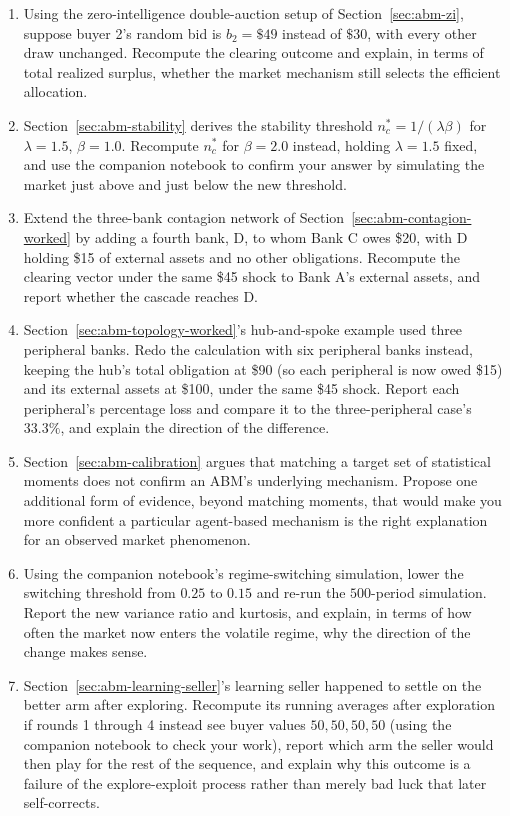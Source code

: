 \documentclass[../ai_in_finance]{subfiles}
\begin{document}

\begin{enumerate}[exercises]
    \item Using the zero-intelligence double-auction setup of Section~\ref{sec:abm-zi}, suppose buyer 2's random bid is $b_2=\$49$ instead of $\$30$, with every other draw unchanged. Recompute the clearing outcome and explain, in terms of total realized surplus, whether the market mechanism still selects the efficient allocation.
    \item Section~\ref{sec:abm-stability} derives the stability threshold $n_c^{*}=1/(\lambda\beta)$ for $\lambda=1.5$, $\beta=1.0$. Recompute $n_c^{*}$ for $\beta=2.0$ instead, holding $\lambda=1.5$ fixed, and use the companion notebook to confirm your answer by simulating the market just above and just below the new threshold.
    \item Extend the three-bank contagion network of Section~\ref{sec:abm-contagion-worked} by adding a fourth bank, D, to whom Bank C owes \$20, with D holding \$15 of external assets and no other obligations. Recompute the clearing vector under the same \$45 shock to Bank A's external assets, and report whether the cascade reaches D.
    \item Section~\ref{sec:abm-topology-worked}'s hub-and-spoke example used three peripheral banks. Redo the calculation with six peripheral banks instead, keeping the hub's total obligation at \$90 (so each peripheral is now owed \$15) and its external assets at \$100, under the same \$45 shock. Report each peripheral's percentage loss and compare it to the three-peripheral case's $33.3\%$, and explain the direction of the difference.
    \item Section~\ref{sec:abm-calibration} argues that matching a target set of statistical moments does not confirm an ABM's underlying mechanism. Propose one additional form of evidence, beyond matching moments, that would make you more confident a particular agent-based mechanism is the right explanation for an observed market phenomenon.
    \item Using the companion notebook's regime-switching simulation, lower the switching threshold from $0.25$ to $0.15$ and re-run the $500$-period simulation. Report the new variance ratio and kurtosis, and explain, in terms of how often the market now enters the volatile regime, why the direction of the change makes sense.
    \item Section~\ref{sec:abm-learning-seller}'s learning seller happened to settle on the better arm after exploring. Recompute its running averages after exploration if rounds 1 through 4 instead see buyer values $50, 50, 50, 50$ (using the companion notebook to check your work), report which arm the seller would then play for the rest of the sequence, and explain why this outcome is a failure of the explore-exploit process rather than merely bad luck that later self-corrects.

\end{enumerate}
\end{document}
